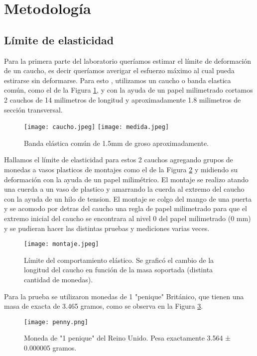 \documentclass[journal,transmag]{IEEEtran}
\begin{document}
\section{Metodología}

\subsection{Límite de elasticidad}
Para la primera parte del laboratorio queríamos estimar el límite de deformación de un caucho, es decir queríamos averigar el esfuerzo máximo al cual pueda estirarse sin deformarse.
 Para esto , utilizamos un caucho o banda elastica común, como el de la Figura \ref{fig1}, y con la ayuda de un papel milimetrado cortamos 2 cauchos de 14 milimetros de longitud y aproximadamente 1.8 milimetros de sección transversal. 

\begin{figure}[!h]
\center
\texttt{[image: caucho.jpeg]}
\texttt{[image: medida.jpeg]}
\caption{Banda elástica común de 1.5mm de groso aproximadamente.}
\label{fig1}
\end{figure}

Hallamos el límite de elasticidad para estos 2 cauchos agregando grupos de monedas a vasos plasticos  de montajes como el de la Figura \ref{fig2} y midiendo su deformación con la ayuda de un papel milimétrico. El montaje se realizo atando una cuerda a un vaso de plastico y amarrando la cuerda al extremo del caucho con la ayuda de un hilo de tension. El montaje se colgo del mango de una puerta y se acomodo por detras del caucho una regla de papel milimetrado para que el extremo inicial del caucho se encontrara al nivel 0 del papel milimetrado (0 mm) y se pudieran hacer las distintas pruebas y mediciones varias veces.
\begin{figure}[!h]
\center
\texttt{[image: montaje.jpeg]}
\caption{Límite del comportamiento elástico. Se graficó el cambio de la longitud del caucho en función de la masa soportada (distinta cantidad de monedas).}
\label{fig2}
\end{figure}

Para la prueba se utilizaron monedas de 1 "penique" Británico, que tienen una masa de exacta de 3.465 gramos, como se observa en la Figura \ref{fig3}.

\begin{figure}[!h]
\center
\texttt{[image: penny.png]}
\caption{Moneda de "1 penique" del Reino Unido. Pesa exactamente 3.564 ± 0.000005 gramos.}
\label{fig3}
\end{figure}
\end{document}
